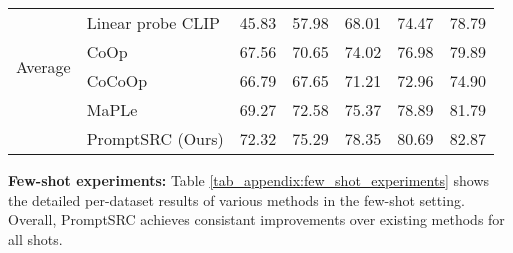 \documentclass[10pt,twocolumn,letterpaper]{article}
\begin{document}
\begin{table*}[t!]
{\begin{tabular}{ll|ccccc}
\midrule
\multirow{4}{*}{Average}       & Linear probe CLIP       & 45.83	&57.98	&68.01	&74.47&	78.79\\
                               & CoOp                    & 67.56	&70.65	&74.02	&76.98	&79.89\\
                               & CoCoOp                & 66.79&	67.65	&71.21&	72.96	&74.90\\
                                                              & MaPLe                  & 69.27	&72.58	&75.37&	78.89&	81.79\\
                               \rowcolor{tabhighlight} &  PromptSRC (Ours)              & 72.32	&75.29	&78.35	&80.69	&82.87\\


\bottomrule
\end{tabular}
}
    \caption{\small Per-dataset performance comparison of PromptSRC with various methods in few-shot setting.}
    \label{tab_appendix:few_shot_experiments}
\vspace{-5mm}
\end{table*}
  \noindent \textbf{{Few-shot experiments:}} Table \ref{tab_appendix:few_shot_experiments} shows the detailed per-dataset results of various methods in the few-shot setting. Overall, PromptSRC achieves consistant improvements over existing methods for all shots. 
\end{document}

